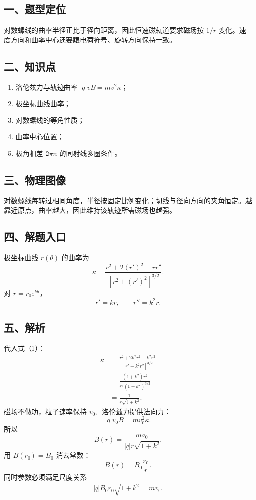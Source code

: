 \documentclass[12pt,a4paper,UTF8]{ctexart}
\newcommand{\tightlist}{\setlength{\itemsep}{0pt}\setlength{\parskip}{0pt}}
\begin{document}
\subsection{一、题型定位}\label{ux4e00ux9898ux578bux5b9aux4f4d-6}

对数螺线的曲率半径正比于径向距离，因此恒速磁轨道要求磁场按 \(1/r\)
变化。速度方向和曲率中心还要跟电荷符号、旋转方向保持一致。

\subsection{二、知识点}\label{ux4e8cux77e5ux8bc6ux70b9-6}

\begin{enumerate}
\def\labelenumi{\arabic{enumi}.}
\tightlist
\item
  洛伦兹力与轨迹曲率 \(|q|vB=mv^2\kappa\)；
\item
  极坐标曲线曲率；
\item
  对数螺线的等角性质；
\item
  曲率中心位置；
\item
  极角相差 \(2\pi n\) 的同射线多圈条件。
\end{enumerate}

\subsection{三、物理图像}\label{ux4e09ux7269ux7406ux56feux50cf-6}

对数螺线每转过相同角度，半径按固定比例变化；切线与径向方向的夹角恒定。越靠近原点，曲率越大，因此维持该轨迹所需磁场也越强。

\subsection{四、解题入口}\label{ux56dbux89e3ux9898ux5165ux53e3-6}

极坐标曲线 \(r(\theta)\) 的曲率为 \[
\kappa=
\frac{r^2+2(r')^2-rr''}
{[r^2+(r')^2]^{3/2}}. \tag{1}
\] 对 \(r=r_0e^{k\theta}\)， \[
r'=kr,\qquad r''=k^2r.
\]

\subsection{五、解析}\label{ux4e94ux89e3ux6790-6}

代入式（1）： \[
\begin{aligned}
\kappa
&=\frac{r^2+2k^2r^2-k^2r^2}
{[r^2+k^2r^2]^{3/2}}\\
&=\frac{(1+k^2)r^2}
{r^3(1+k^2)^{3/2}}\\
&=\boxed{\frac{1}{r\sqrt{1+k^2}}}.
\end{aligned} \tag{2}
\] 磁场不做功，粒子速率保持 \(v_0\)。洛伦兹力提供法向力： \[
|q|v_0B=mv_0^2\kappa.
\] 所以 \[
B(r)=\frac{mv_0}{|q|r\sqrt{1+k^2}}.
\] 用 \(B(r_0)=B_0\) 消去常数： \[
\boxed{B(r)=B_0\frac{r_0}{r}}. \tag{3}
\] 同时参数必须满足尺度关系 \[
\boxed{|q|B_0r_0\sqrt{1+k^2}=mv_0}. \tag{4}
\]
\end{document}
